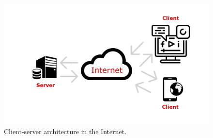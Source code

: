 \documentclass{article} %
\begin{document}
\begin{figure}[ht]
  \centering
      \includegraphics[width=1\textwidth]{client-server.png}
  \caption{Client-server architecture in the Internet.}
  \label{fig:client-server}
\end{figure}
\end{document}
